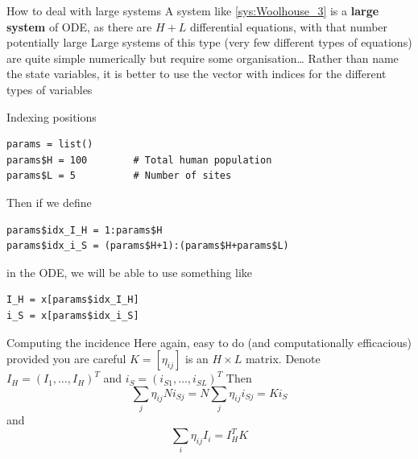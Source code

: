 \documentclass[aspectratio=169]{beamer}
\begin{document}
\begin{frame}{How to deal with large systems}
A system like \eqref{sys:Woolhouse_3} is a \textbf{large system} of ODE, as there are $H+L$ differential equations, with that number potentially large
\vfill
Large systems of this type (very few different types of equations) are quite simple numerically but require some organisation\dots 
\vfill
Rather than name the state variables, it is better to use the vector  with indices for the different types of variables
\end{frame}

\begin{frame}[fragile]{Indexing positions}
\begin{lstlisting}
params = list()
params$H = 100        # Total human population
params$L = 5          # Number of sites  
\end{lstlisting}
Then if we define
\begin{lstlisting}
params$idx_I_H = 1:params$H
params$idx_i_S = (params$H+1):(params$H+params$L)  
\end{lstlisting}
in the ODE, we will be able to use something like
\begin{lstlisting}
I_H = x[params$idx_I_H]
i_S = x[params$idx_i_S]
\end{lstlisting}
\end{frame}

\begin{frame}{Computing the incidence}
Here again, easy to do (and computationally efficacious) provided you are careful
\vfill
$K=[\eta_{ij}]$ is an $H\times L$ matrix. Denote $I_H=(I_{1},\ldots,I_{H})^T$ and $i_S=(i_{S1},\ldots,i_{SL})^T$
\vfill
Then
\[
  \sum_j \eta_{ij}Ni_{Sj} = N\sum_j \eta_{ij}i_{Sj}
  =K i_S
\]
and
\[
  \sum_i \eta_{ij}I_i = I_H^TK
\]
\end{frame}


\end{document}

